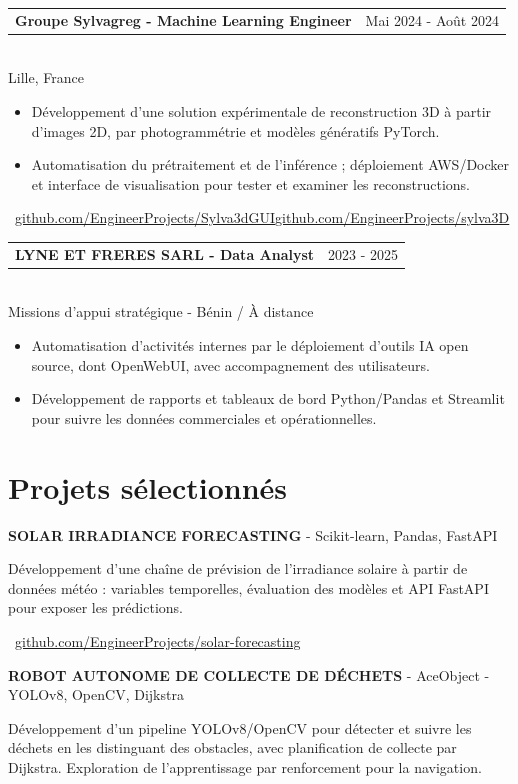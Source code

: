 \documentclass[10pt,a4paper]{article}
\makeatletter
\newcommand{\role}[3]{%
  \vspace{3pt}
  \begin{tabularx}{\linewidth}{@{}Xr@{}}
  \textbf{#1} & {\color{muted}#2}
  \end{tabularx}\vspace{0.8pt}\\
  {\color{muted}#3}\par
  \vspace{3pt}
}
\newcommand{\projectline}[2]{%
  \textbf{#1} - #2\par
}
\newcommand{\githublink}[2]{%
  \par{\footnotesize\color{accent}\faIcon{github}\ \href{#1}{#2}}\par
}
\newlength{\maincolumnheight}
\makeatother
\begin{document}
\begin{lrbox}{\maincolumnbox}
\begin{minipage}[t]{0.695\textwidth}
\vspace{8pt}
\role{Groupe Sylvagreg - Machine Learning Engineer}{Mai 2024 - Août 2024}{Lille, France}
\begin{itemize}
  \item Développement d'une solution expérimentale de reconstruction 3D à partir d'images 2D, par photogrammétrie et modèles génératifs PyTorch.
  \item Automatisation du prétraitement et de l'inférence ; déploiement AWS/Docker et interface de visualisation pour tester et examiner les reconstructions.
\end{itemize}
{\fontsize{7.5pt}{9pt}\selectfont\color{accent}\ \href{https://github.com/EngineerProjects/Sylva3dGUI}{github.com/EngineerProjects/Sylva3dGUI}\enspace\textbullet\enspace\href{https://github.com/EngineerProjects/sylva3D}{github.com/EngineerProjects/sylva3D}}\par

\vspace{8pt}
\role{LYNE ET FRERES SARL - Data Analyst}{2023 - 2025}{Missions d'appui stratégique - Bénin / À distance}
\begin{itemize}
  \item Automatisation d'activités internes par le déploiement d'outils IA open source, dont OpenWebUI, avec accompagnement des utilisateurs.
  \item Développement de rapports et tableaux de bord Python/Pandas et Streamlit pour suivre les données commerciales et opérationnelles.
\end{itemize}

\section{Projets sélectionnés}
\projectline{SOLAR IRRADIANCE FORECASTING}{Scikit-learn, Pandas, FastAPI}
Développement d'une chaîne de prévision de l'irradiance solaire à partir de données météo : variables temporelles, évaluation des modèles et API FastAPI pour exposer les prédictions.
\githublink{https://github.com/EngineerProjects/solar-forecasting}{github.com/EngineerProjects/solar-forecasting}

\vspace{8pt}
\projectline{ROBOT AUTONOME DE COLLECTE DE DÉCHETS}{AceObject - YOLOv8, OpenCV, Dijkstra}
Développement d'un pipeline YOLOv8/OpenCV pour détecter et suivre les déchets en les distinguant des obstacles, avec planification de collecte par Dijkstra. Exploration de l'apprentissage par renforcement pour la navigation.

\end{minipage}
\end{lrbox}
\setlength{\maincolumnheight}{\dimexpr\ht\maincolumnbox+\dp\maincolumnbox\relax}
\end{document}
